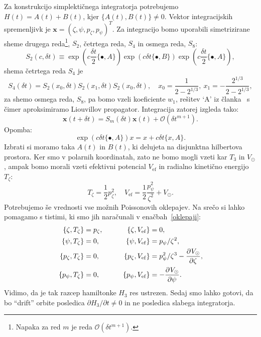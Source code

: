 \documentclass[12pt, a4paper]{article}
\newcommand{\sfrac}[2]{
    \ensuremath{\textstyle{\frac{#1}{#2}}}
}
\newcommand{\der}[3][]{
    \ensuremath{ \frac{\partial^{#1} #2}{\partial #3^{#1}} }
}
\newcommand{\Vef}{
    \ensuremath{V_\mathrm{ef}}
}
\begin{document}
Za konstrukcijo simplekti\v cnega integratorja potrebujemo $H(t) = A(t) + B(t)$, kjer $\{A(t), B(t)\} \neq 0$.
Vektor integracijskih spremenljivk je $\mathbf{x} = (\zeta, \psi, p_\zeta, p_\psi)^T$. Za integracijo bomo
uporabili simetrizirane sheme drugega reda\footnote{Napaka za red $m$ je reda $\mathcal{O}(\delta t^{m+1})$.},
$S_2$, \v cetrtega reda, $S_4$ in osmega reda, $S_8$:
\[
    S_2(c,\delta t) \equiv \exp(c\sfrac{\delta t}{2}\{\bullet, A\})\exp(c\delta t\{\bullet, B\})
    \exp(c\sfrac{\delta t}{2}\{\bullet, A\}),
\]
shema \v cetrtega reda $S_4$ je
\begin{equation}
    S_4(\delta t) = S_2(x_0, \delta t) S_2 (x_1, \delta t) S_2 (x_0, \delta t), \quad
        x_0 = \frac{1}{2 - 2^{1/3}},\ x_1 = -\frac{2^{1/3}}{2 - 2^{1/3}},
\end{equation}
za shemo osmega reda, $S_8$, pa bomo vzeli koeficiente $w_1$, re\v sitev `$\mathrm{A}$' iz \v clanka~\cite{yoshida}
s \v cimer aproksimiramo Liouvillov propagator. Integracija zatorej izgleda tako:
\[
	\mathbf{x}(t + \delta t) = S_m(\delta t) \mathbf{x}(t) + \mathcal{O}(\delta t^{m+1}).
\]
Opomba:
\[
    \exp(c\delta t\{\bullet, A\})x = x + c\delta t\{x, A\}.
\]
Izbrati si moramo taka $A(t)$ in $B(t)$, ki delujeta na disjunktna hilbertova prostora. Ker smo v polarnih koordinatah,
zato ne bomo mogli vzeti kar $T_3$ in $V_\odot$, ampak bomo morali vzeti efektivni potencial $\Vef$ in radialno
kineti\v cno energijo $T_\zeta$:
\begin{equation}
    T_\zeta = \frac{1}{2}p_\zeta^2, \quad \Vef = \frac{1}{2}\frac{p_\psi^2}{\zeta^2} + V_\odot.
\end{equation}
Potrebujemo \v se vrednosti vse mo\v znih Poissonovih oklepajev. Na sre\v co si lahko pomagamo s tistimi, ki
smo jih nara\v cunali v ena\v cbah~\eqref{oklepaji}:
\begin{alignat}{3}
    \{\zeta, T_\zeta\}        &= p_\zeta, \qquad &
    \{\zeta, \Vef\}           &= 0, \notag \\
    \{\psi, T_\zeta\}         &= 0, \qquad &
    \{\psi, \Vef\}            &= p_\psi/\zeta^2, \notag \\
    \{p_\zeta, T_\zeta\}      &= 0, \qquad&
    \{p_\zeta, \Vef\}         &= p^2_\psi/\zeta^3 - \der{V_\odot}{\zeta}, \notag \\
    \{p_\psi, T_\zeta\}       &= 0, \qquad &
    \{p_\psi, \Vef\}          &= -\der{V_\odot}{\psi}.
\end{alignat}
Vidimo, da je tak razcep hamiltonke $H_3$ res ustrezen. Sedaj smo lahko gotovi, da bo "`drift"' orbite posledica
$\partial H_3 / \partial t \neq 0$ in ne posledica slabega integratorja.
\end{document}

